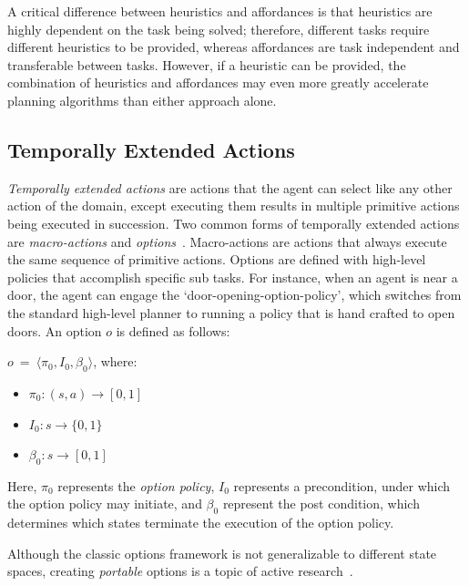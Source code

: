 \documentclass[]{article}
\newcommand{\jmnote}[1]{\textcolor{Green}{\textbf{JM: #1}}}
\begin{document}
A critical difference between heuristics and affordances is that heuristics are highly dependent on the task being solved; therefore, different tasks require different heuristics to be provided, whereas affordances are task independent and transferable between tasks. However, if a heuristic can be provided, the combination of heuristics and affordances may even more greatly accelerate planning algorithms than either approach alone.


\subsection{Temporally Extended Actions}

{\em Temporally extended actions} are actions that the agent can
select like any other action of the domain, except executing them
results in multiple primitive actions being executed in
succession. Two common forms of temporally extended actions are {\em
  macro-actions}%
  and {\em
  options}~\citep{sutton99}. Macro-actions are actions that always
execute the same sequence of primitive actions. Options are defined
with high-level policies that accomplish specific sub tasks. For
instance, when an agent is near a door, the agent can engage the
`door-opening-option-policy', which switches from the standard
high-level planner to running a policy that is hand crafted to open
doors. An option $o$ is defined as follows:

$o\ =\ \langle \pi_0, I_0, \beta_0\rangle$, where:

\begin{itemize}
\item[] $\pi_0 : (s,a) \rightarrow [0,1]$
\item[] $I_0 : s \rightarrow \{0,1\}$
\item[] $\beta_0 : s \rightarrow [0,1]$
\end{itemize}

Here, $\pi_0$ represents the {\it option policy}, $I_0$ represents
a precondition, under which the option policy may initiate, and 
$\beta_0$ represent the post condition, which determines which 
states terminate the execution of the option policy.

Although the classic options framework is not generalizable to different state spaces,
creating {\em portable} options is a topic of active research~\citep{konidaris07,konidaris2009efficient,Ravindran03analgebraic,croonenborghs2008learning,andre2002state,konidaris2012transfer}.
\end{document}
